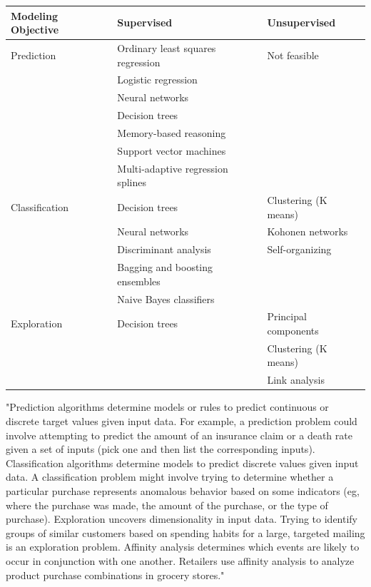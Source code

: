 \begin{table}[ht!]
  \begin{center}
    \label{tab:table9}
    {\begin{tabular}{l|l|l}
      \textbf{Modeling Objective} & \textbf{Supervised} & \textbf{Unsupervised}\\
      \hline
       Prediction & Ordinary least squares regression & Not feasible \\
       & Logistic regression &\\
       & Neural networks &\\
       & Decision trees &\\
       & Memory-based reasoning &\\
       & Support vector machines &\\
       & Multi-adaptive regression splines &\\
       Classification & Decision trees & Clustering (K means) \\
        & Neural networks & Kohonen networks \\
        & Discriminant analysis & Self-organizing \\
        & Bagging and boosting ensembles & \\
        & Naive Bayes classifiers & \\
       Exploration & Decision trees & Principal components \\
       & & Clustering (K means) \\
       & & Link analysis \\
    \end{tabular}}
  \end{center}
\end{table}

"Prediction algorithms determine models or rules to predict continuous or discrete target values given input data. For example, a prediction problem could involve attempting to predict the amount of an insurance claim or a death rate given a set of inputs (pick one and then list the corresponding inputs). Classification algorithms determine models to predict discrete values given input data. A classification problem might involve trying to determine whether a particular purchase represents anomalous behavior based on some indicators (eg, where the purchase was made, the amount of the purchase, or the type of purchase). Exploration uncovers dimensionality in input data. Trying to identify groups of similar customers based on spending habits for a large, targeted mailing is an exploration problem. Affinity analysis determines which events are likely to occur in conjunction with one another. Retailers use affinity analysis to analyze product purchase combinations in grocery stores." \cite{hoho}

